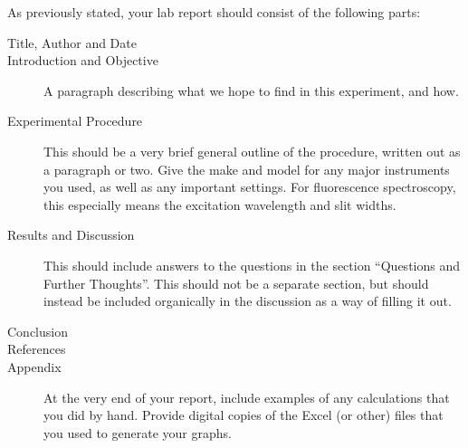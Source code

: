 \documentclass[nobib,nofonts,nols,nohyper]{tufte-handout}
\begin{document}
As previously stated, your lab report should consist of the following parts:
\begin{description}
	\item[Title, Author and Date]
	\item[Introduction and Objective] A paragraph describing what we hope to find in this experiment, and how.
	\item[Experimental Procedure] This should be a very brief general outline of the procedure, written out as a paragraph or two. Give the make and model for any major instruments you used, as well as any important settings. For fluorescence spectroscopy, this especially means the excitation wavelength and slit widths.
	\item[Results and Discussion] This should include answers to the questions in the section ``Questions and Further Thoughts''. This should not be a separate section, but should instead be included organically in the discussion as a way of filling it out.
	\item[Conclusion]
	\item[References]
	\item[Appendix] At the very end of your report, include examples of any calculations that you did by hand. 
	Provide digital copies of the Excel (or other) files that you used to generate your graphs.
\end{description}



\nocite{*}
\printbibliography[category=cited]%

\printbibliography[
title={Further Reading},
notcategory=cited,
resetnumbers,
prefixnumbers={F},
]
\end{document}
